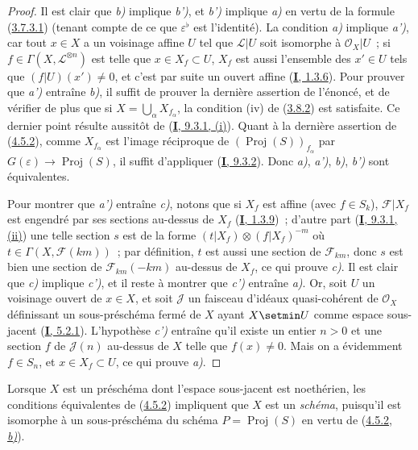 \begin{proof}
Il est clair que \emph{b)} implique \emph{b')}, et \emph{b')} implique \emph{a)} en vertu de la formule
(\hyperref[II.3.7.3.1-fr]{3.7.3.1}) (tenant compte de ce que
$\varepsilon^\flat$ est l'identité). La condition \emph{a)} implique \emph{a')}, car tout
$x\in X$ a un voisinage affine $U$ tel que
$\mathcal{L}|U$ soit isomorphe à $\mathcal{O}_X|U$~; si
$f\in\Gamma(X,\mathcal{L}^{\otimes n})$ est telle que $x\in X_f\subset U$,
$X_f$ est aussi l'ensemble des $x'\in U$ tels que $(f|U)(x')\neq0$, et c'est
par suite un ouvert affine (\hyperref[I.1.3.6-fr]{\textbf{I}, 1.3.6}). Pour prouver
que \emph{a')} entraîne \emph{b)}, il suffit de prouver la dernière assertion de l'énoncé,
et de vérifier de plus que si $X=\bigcup_\alpha X_{f_\alpha}$, la condition
(iv) de (\hyperref[II.3.8.2-fr]{3.8.2}) est satisfaite. Ce dernier point
résulte aussitôt de (\hyperref[I.9.3.1-fr]{\textbf{I}, 9.3.1, (i)}). Quant à la
dernière assertion de (\hyperref[II.4.5.2-fr]{4.5.2}), comme
$X_{f_\alpha}$ est l'image réciproque de
$(\operatorname{Proj}(S))_{f_\alpha}$ par
$G(\varepsilon)\to\operatorname{Proj}(S)$, il suffit d'appliquer
(\hyperref[I.9.3.2-fr]{\textbf{I}, 9.3.2}). Donc \emph{a)}, \emph{a')}, \emph{b)}, \emph{b')} sont équivalentes.

Pour montrer que \emph{a')} entraîne \emph{c)}, notons que si $X_f$ est affine (avec
$f\in S_k$), $\mathcal{F}|X_f$ est engendré par ses sections au-dessus de
$X_f$ (\hyperref[I.1.3.9-fr]{\textbf{I}, 1.3.9})~; d'autre part
(\hyperref[I.9.3.1-fr]{\textbf{I}, 9.3.1, (ii)}) une telle section $s$ est de la forme
$(t|X_f)\otimes(f|X_f)^{-m}$ où
$t\in\Gamma(X,\mathcal{F}(km))$~; par définition, $t$ est aussi une section
de $\mathcal{F}_{km}$, donc $s$ est bien une section de
$\mathcal{F}_{km}(-km)$ au-dessus de $X_f$, ce qui prouve \emph{c)}. Il est clair
que \emph{c)} implique \emph{c')}, et il reste à montrer que \emph{c')} entraîne \emph{a)}. Or, soit $U$
un voisinage ouvert de $x\in X$, et soit $\mathcal{J}$ un faisceau d'idéaux
quasi-cohérent de $\mathcal{O}_X$ définissant un sous-préschéma fermé de $X$
ayant $X\setmin U$ comme espace sous-jacent
(\hyperref[I.5.2.1-fr]{\textbf{I}, 5.2.1}). L'hypothèse \emph{c')} entraîne qu'il existe un
entier $n>0$ et une section $f$ de $\mathcal{J}(n)$ au-dessus de $X$ telle
que $f(x)\neq0$. Mais on a évidemment $f\in S_n$, et $x\in X_f\subset U$, ce
qui prouve \emph{a)}.
\end{proof}

Lorsque $X$ est un préschéma dont l'espace sous-jacent est noethérien, les
conditions équivalentes de (\hyperref[II.4.5.2-fr]{4.5.2}) impliquent que
$X$ est un \emph{schéma}, puisqu'il est isomorphe à un sous-préschéma du schéma
$P=\operatorname{Proj}(S)$ en vertu de
(\hyperref[II.4.5.2-fr]{4.5.2, \emph{b)}}).

